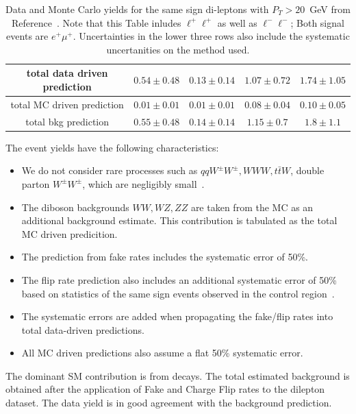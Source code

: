 \begin{table}[htb]
\begin{center}
\begin{tabular}{|c|c|c|c|c|}
total data driven prediction & $0.54\pm 0.48$ & $0.13\pm 0.14$ & $1.07\pm 0.72$ & $1.74\pm 1.05$ \\ \hline
total MC driven prediction & $0.01\pm 0.01$ & $0.01\pm 0.01$ & $0.08\pm 0.04$ & $0.10\pm 0.05$ \\\hline\hline
total bkg prediction & $0.55\pm 0.48$ & $0.14\pm 0.14$ & $1.15\pm 0.7$ & $1.8\pm 1.1$ \\\hline
\end{tabular}
\caption{\protect Data and Monte Carlo yields for the same sign di-leptons with $P_T >20$\ GeV
from Reference~\cite{ssnote1}.  Note that this Table inludes $\ell^+\ell^+$ as well
as $\ell^-\ell^-$; Both signal events are $e^+\mu^+$.
Uncertainties in the lower three rows also include the systematic 
uncertanities on the method used.\label{tab:ssyields} }
\end{center}
\end{table}

The event yields have the following characteristics:

\begin{itemize}
\item We do not consider rare processes such as $qqW^\pm W^\pm, WWW, t\bar{t}W$, double parton $W^\pm W^\pm$, which are 
negligibly small~\cite{ssnote1}.
\item The diboson backgrounds $WW, WZ, ZZ$ are taken from the MC as an additional background estimate. This contribution
is tabulated as the total MC driven predicition.
\item The prediction from fake rates includes the systematic error of 50\%. 
\item The flip rate prediction also includes an additional systematic error of 50\% based on statistics of the same
sign events observed in the control region~\cite{ssnote1}.
\item The systematic errors are added when propagating the fake/flip rates into total data-driven predictions.
\item All MC driven predictions also assume a flat 50\% systematic error.
\end{itemize}

The dominant SM contribution is from \ttbar decays. The total estimated background 
is obtained after the application of Fake and Charge Flip rates 
to the dilepton dataset\cite{ssnote1}. 
The data yield is in good agreement with the background prediction. 

